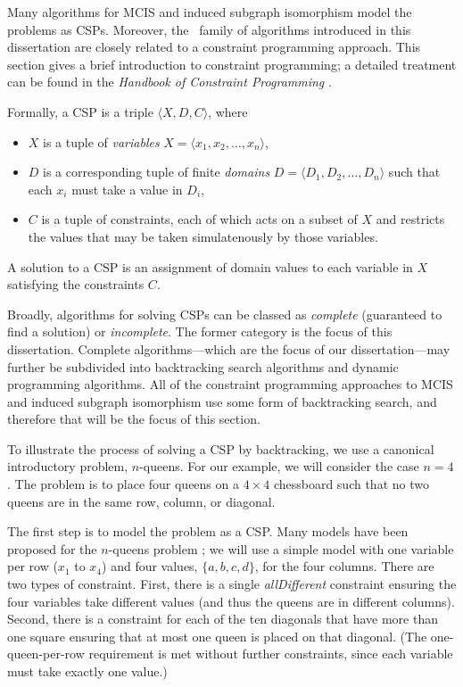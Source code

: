 Many algorithms
for MCIS and induced subgraph isomorphism model the problems as CSPs.
Moreover, the \McSplit\ family of algorithms introduced in this dissertation
are closely related to a constraint programming approach.
This section gives a brief introduction to constraint programming;
a detailed treatment can be found in the \emph{Handbook of Constraint
Programming} \citep{DBLP:reference/fai/2}.

Formally, a CSP is a triple $\langle X, D, C\rangle$, where

\begin{itemize}
\item $X$ is a tuple of \emph{variables} $X = \langle x_1, x_2, \dots, x_n \rangle$,
\item $D$ is a corresponding tuple of finite \emph{domains} $D = \langle D_1, D_2, \dots, D_n\rangle$
  such that each $x_i$ must take a value in $D_i$,
\item $C$ is a tuple of constraints, each of which acts on a subset of $X$ and restricts
  the values that may be taken simulatenously by those variables.
\end{itemize}

A solution to a CSP is an assignment of domain values to each variable in $X$
satisfying the constraints $C$.

Broadly, algorithms for solving CSPs can be classed as \emph{complete} (guaranteed to find a solution)
or \emph{incomplete}. The former category is the focus of this dissertation.
Complete algorithms---which are the focus of our dissertation---may further
be subdivided into backtracking search algorithms and dynamic programming
algorithms. All of the constraint programming approaches to MCIS and induced
subgraph isomorphism use some form of backtracking search, and therefore that will
be the focus of this section.

To illustrate the process of solving a CSP by backtracking, we use a canonical
introductory problem, $n$-queens. For our example, we will consider the case
$n=4$. The problem is to place four queens on a $4 \times 4$ chessboard such
that no two queens are in the same row, column, or diagonal.

The first step is to model the problem as a CSP. Many models have been proposed
for the $n$-queens problem \citep{DBLP:reference/fai/Smith06}; we will use a
simple model with one variable per row ($x_1$ to $x_4$) and four values, $\{a, b, c, d\}$, for
the four columns.  There are two types of constraint. First, there is a single
\emph{allDifferent} constraint ensuring the four variables take different
values (and thus the queens are in different columns). Second, there is a
constraint for each of the ten diagonals that have more than one square
ensuring that at most one queen is placed on that diagonal.
(The one-queen-per-row requirement is met without further constraints,
since each variable must take exactly one value.)

